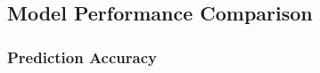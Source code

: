\documentclass[12pt,a4paper]{article}
\begin{document}
\subsection{Model Performance Comparison}

\subsubsection{Prediction Accuracy}
\end{document}
